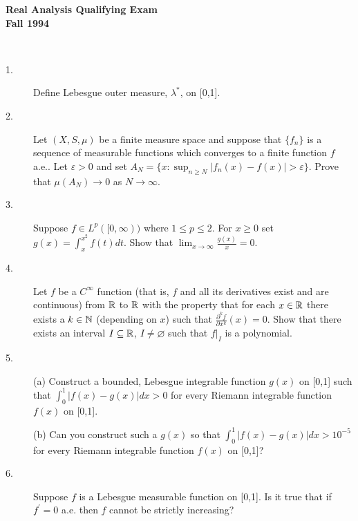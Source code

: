 \documentclass{article}
\begin{document}






\begin{center}\begin{LARGE}
{\bf Real Analysis Qualifying Exam}\\ 
{\bf Fall 1994}\\ \end{LARGE}
\end{center}
\vspace{0.1in}
\noindent\hrulefill\\

\begin{description}
\item[1.]
Define Lebesgue outer measure, $\lambda^\ast$, on [0,1].

\item[2.]
Let $(X,S, \mu)$ be a finite measure space and suppose that
$\{f_n\}$ is a sequence of measurable functions which converges to a finite
function $f$ a.e.. Let $\varepsilon > 0$ and set
$A_N = \{x : \sup_{n \geq N} |f_n(x) - f(x) | > \varepsilon \}$.
Prove that $\mu(A_N) \to 0$ as $N \to \infty$.

\item[3.]
Suppose $f \in L^p ([0,\infty))$ where $1 \leq p \leq 2$. For $x \geq 0$
set $g(x) = \int^{x^2}_x f(t) dt$. Show that
$\lim_{x \to \infty} \frac{g(x)}{x} = 0$.

\item[4.]
Let $f$ be a $C^\infty$ function (that is, $f$ and all its derivatives
exist and are continuous) from $\Bbb R$ to $\Bbb R$ with the property that
for each $x \in \Bbb R$ there exists a $k \in \Bbb N$ (depending on $x$)
such that $\frac{\partial^k f}{\partial x^k} (x) =0$. Show that there
exists an interval $I \subseteq \Bbb R$, $I \neq \varnothing$
such that $f|_I$ is a polynomial.

\item[5.] (a)
Construct a bounded, Lebesgue integrable function $g(x)$ on [0,1] such that
$\int^1_0 |f(x) - g(x)| dx > 0$ for every Riemann integrable function
$f(x)$ on [0,1].

\item[\quad] (b)
Can you construct such a $g(x)$ so that $\int^1_0 |f(x) - g(x)| dx > 10^{-5}$
for every Riemann integrable function $f(x)$ on [0,1]?

\item[6.]
Suppose $f$ is a Lebesgue measurable function on [0,1]. Is it true that if
$f^\prime = 0$ a.e. then $f$ cannot be strictly increasing?


\end{description}
\end{document}
